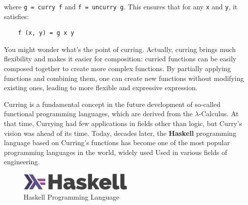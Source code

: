 \noindent where \lstinline{g = curry f} and \lstinline{f = uncurry g}. This ensures that for any \texttt{x} and \texttt{y}, it satisfies:

\begin{lstlisting}
    f (x, y) = g x y
\end{lstlisting}

You might wonder what's the point of curring. 
Actually, curring brings much flexibility and makes it easier for composition: curried functions can be easily composed together to create more complex functions. 
By partially applying functions and combining them, one can create new functions without modifying existing ones, leading to more flexible and expressive expression.

Curring is a fundamental concept in the future development of so-called functional programming languages, which are derived from the $\lambda$-Calculus.
At that time, Currying had few applications in fields other than logic, but Curry's vision was ahead of its time. 
Today, decades later, the \textbf{Haskell} programming language based on Curring's functions has become one of the most popular programming languages in the world, widely used Used in various fields of engineering.
\begin{figure}
    \centering
    \includegraphics[width=0.5\textwidth]{figures/haskell.png}
    \caption{Haskell Programming Language}
    \label{fig:haskell}
\end{figure}